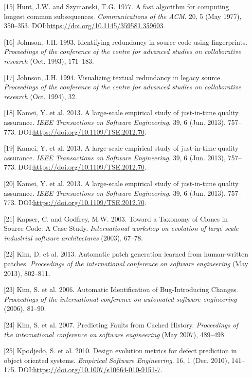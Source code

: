 \documentclass[sigconf]{acmart}
\begin{document}
[15] Hunt, J.W. and Szymanski, T.G. 1977. A fast algorithm for
computing longest common subsequences. \emph{Communications of the ACM}.
20, 5 (May 1977), 350--353.
DOI:\url{https://doi.org/10.1145/359581.359603}.


[16] Johnson, J.H. 1993. Identifying redundancy in source code using
fingerprints. \emph{Proceedings of the conference of the centre for
advanced studies on collaborative research} (Oct. 1993), 171--183.


[17] Johnson, J.H. 1994. Visualizing textual redundancy in legacy
source. \emph{Proceedings of the conference of the centre for advanced
studies on collaborative research} (Oct. 1994), 32.


[18] Kamei, Y. et al. 2013. A large-scale empirical study of
just-in-time quality assurance. \emph{IEEE Transactions on Software
Engineering}. 39, 6 (Jun. 2013), 757--773.
DOI:\url{https://doi.org/10.1109/TSE.2012.70}.


[19] Kamei, Y. et al. 2013. A large-scale empirical study of
just-in-time quality assurance. \emph{IEEE Transactions on Software
Engineering}. 39, 6 (Jun. 2013), 757--773.
DOI:\url{https://doi.org/10.1109/TSE.2012.70}.


[20] Kamei, Y. et al. 2013. A large-scale empirical study of
just-in-time quality assurance. \emph{IEEE Transactions on Software
Engineering}. 39, 6 (Jun. 2013), 757--773.
DOI:\url{https://doi.org/10.1109/TSE.2012.70}.


[21] Kapser, C. and Godfrey, M.W. 2003. Toward a Taxonomy of Clones
in Source Code: A Case Study. \emph{International workshop on evolution
of large scale industrial software architectures} (2003), 67--78.


[22] Kim, D. et al. 2013. Automatic patch generation learned from
human-written patches. \emph{Proceedings of the international conference
on software engineering} (May 2013), 802--811.


[23] Kim, S. et al. 2006. Automatic Identification of
Bug-Introducing Changes. \emph{Proceedings of the international
conference on automated software engineering} (2006), 81--90.


[24] Kim, S. et al. 2007. Predicting Faults from Cached History.
\emph{Proceedings of the international conference on software
engineering} (May 2007), 489--498.


[25] Kpodjedo, S. et al. 2010. Design evolution metrics for defect
prediction in object oriented systems. \emph{Empirical Software
Engineering}. 16, 1 (Dec. 2010), 141--175.
DOI:\url{https://doi.org/10.1007/s10664-010-9151-7}.
\end{document}
